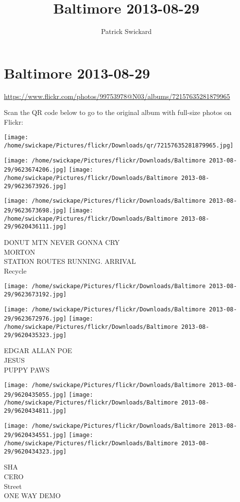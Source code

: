 \documentclass[10pt,letterpaper]{article}
\title{Baltimore 2013-08-29}
\author{Patrick Swickard}
\date{}
\begin{document}
\section*{Baltimore 2013-08-29}

\url{https://www.flickr.com/photos/99753978@N03/albums/72157635281879965}

Scan the QR code below to go to the original album with full-size photos on Flickr:

\texttt{[image: /home/swickape/Pictures/flickr/Downloads/qr/72157635281879965.jpg]}
\pagebreak

\texttt{[image: /home/swickape/Pictures/flickr/Downloads/Baltimore 2013-08-29/9623674206.jpg]}
\texttt{[image: /home/swickape/Pictures/flickr/Downloads/Baltimore 2013-08-29/9623673926.jpg]}

\texttt{[image: /home/swickape/Pictures/flickr/Downloads/Baltimore 2013-08-29/9623673698.jpg]}
\texttt{[image: /home/swickape/Pictures/flickr/Downloads/Baltimore 2013-08-29/9620436111.jpg]}

DONUT MTN NEVER GONNA CRY\\
MORTON\\
STATION ROUTES RUNNING. ARRIVAL\\
Recycle
\pagebreak

\texttt{[image: /home/swickape/Pictures/flickr/Downloads/Baltimore 2013-08-29/9623673192.jpg]}

\vspace{0.25in}
\texttt{[image: /home/swickape/Pictures/flickr/Downloads/Baltimore 2013-08-29/9623672976.jpg]}
\texttt{[image: /home/swickape/Pictures/flickr/Downloads/Baltimore 2013-08-29/9620435323.jpg]}

EDGAR ALLAN POE\\
JESUS\\
PUPPY PAWS
\pagebreak

\texttt{[image: /home/swickape/Pictures/flickr/Downloads/Baltimore 2013-08-29/9620435055.jpg]}
\texttt{[image: /home/swickape/Pictures/flickr/Downloads/Baltimore 2013-08-29/9620434811.jpg]}

\texttt{[image: /home/swickape/Pictures/flickr/Downloads/Baltimore 2013-08-29/9620434551.jpg]}
\texttt{[image: /home/swickape/Pictures/flickr/Downloads/Baltimore 2013-08-29/9620434323.jpg]}

SHA\\
CERO\\
Street\\
ONE WAY DEMO
\pagebreak
\end{document}
